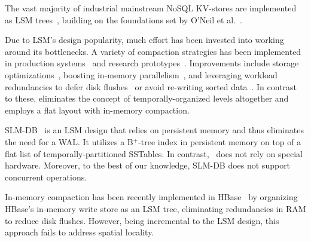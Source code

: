 

The vast majority of industrial mainstream NoSQL KV-stores are  implemented as LSM trees~\cite{hbase, 
RocksDB, scylladb, Bigtable2008, cassandra2010}, building on the foundations set by O'Neil 
et al.~\cite{DBLP:journals/acta/ONeilCGO96, Muth1998}. 

Due to LSM's design popularity, much effort has been invested into working around its bottlenecks.
A variety of compaction strategies has been implemented in production systems~\cite{CallaghanCompaction, 
ScyllaCompaction} and research prototypes~\cite{triad, PebblesDB, vttrees, slmdb}.  Improvements
 include storage
optimizations~\cite{WiscKey, PebblesDB, vttrees, slmdb,Papagiannis:2018:EMK:3267809.3267824}, 
boosting  in-memory parallelism~\cite{scylladb, clsm2015}, and leveraging 
 workload redundancies to defer disk flushes~\cite{triad, accordion} or avoid re-writing sorted data~\cite{vttrees}. 
In contrast to these, \sys\/ eliminates the concept of temporally-organized levels altogether
and employs a flat  layout with in-memory compaction.


SLM-DB~\cite{slmdb} is an LSM design that relies on persistent memory and thus eliminates the need for a WAL. It  
utilizes a B$^+$-tree index in persistent memory on top of a flat list of temporally-partitioned SSTables. 
In contrast, \sys\ does not rely on special hardware. 
Moreover, to the best of our knowledge, SLM-DB does not support concurrent operations.

In-memory compaction has been recently implemented in HBase~\cite{accordion} by organizing
HBase's in-memory write store  as an LSM tree, eliminating redundancies 
in RAM to reduce disk flushes. However, being incremental to the LSM design, 
this approach fails to address spatial locality. 

